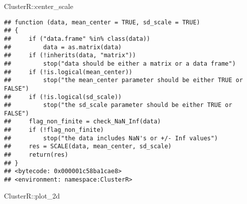 \documentclass[
]{article}
\newenvironment{Shaded}{\begin{snugshade}}{\end{snugshade}}
\newcommand{\NormalTok}[1]{#1}
\newcommand{\SpecialCharTok}[1]{\textcolor[rgb]{0.00,0.00,0.00}{#1}}
\begin{document}
\begin{Shaded}
\begin{Highlighting}[]
\NormalTok{ClusterR}\SpecialCharTok{::}\NormalTok{center\_scale}
\end{Highlighting}
\end{Shaded}

\begin{verbatim}
## function (data, mean_center = TRUE, sd_scale = TRUE) 
## {
##     if ("data.frame" %in% class(data)) 
##         data = as.matrix(data)
##     if (!inherits(data, "matrix")) 
##         stop("data should be either a matrix or a data frame")
##     if (!is.logical(mean_center)) 
##         stop("the mean_center parameter should be either TRUE or FALSE")
##     if (!is.logical(sd_scale)) 
##         stop("the sd_scale parameter should be either TRUE or FALSE")
##     flag_non_finite = check_NaN_Inf(data)
##     if (!flag_non_finite) 
##         stop("the data includes NaN's or +/- Inf values")
##     res = SCALE(data, mean_center, sd_scale)
##     return(res)
## }
## <bytecode: 0x000001c58ba1cae8>
## <environment: namespace:ClusterR>
\end{verbatim}

\begin{Shaded}
\begin{Highlighting}[]
\NormalTok{ClusterR}\SpecialCharTok{::}\NormalTok{plot\_2d}
\end{Highlighting}
\end{Shaded}
\end{document}
